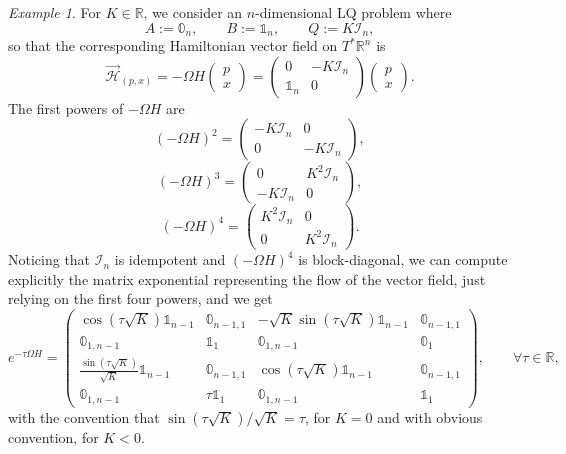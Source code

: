 \documentclass[reqno]{amsart}
\theoremstyle{plain}
\theoremstyle{definition}
\theoremstyle{remark}
\newtheorem{exmp}[thm]{Example}
\begin{document}
\begin{exmp}
			For $K\in\mathbb{R}$, we consider an $n$-dimensional LQ problem where 
			\begin{equation}
				A:=\mathbb{0}_n,\qquad B:=\mathbb{1}_n,\qquad Q:=K\mathcal{I}_n,
			\end{equation}
			so that the corresponding Hamiltonian vector field on $T^*\mathbb{R}^n$ is 
			\begin{equation}
				\overrightarrow{\mathcal{H}}_{(p,x)}=-\Omega H\begin{pmatrix}
					p\\
					x
				\end{pmatrix}=\begin{pmatrix}
					0 & -K\mathcal{I}_n\\
					\mathbb{1}_n & 0
				\end{pmatrix}\begin{pmatrix}
					p\\
					x
				\end{pmatrix}.
			\end{equation}
			The first powers of $-\Omega H$ are 
			\begin{equation}
				(-\Omega H)^2=\begin{pmatrix}
					-K\mathcal{I}_n & 0\\
					0 & -K\mathcal{I}_n
				\end{pmatrix},
			\end{equation}
			\begin{equation}
				(-\Omega H)^3=\begin{pmatrix}
					0 & K^2\mathcal{I}_n\\
					-K\mathcal{I}_n& 0
				\end{pmatrix},
			\end{equation}
			\begin{equation}
				(-\Omega H)^4=\begin{pmatrix}
					K^2\mathcal{I}_n & 0\\
					0 & K^2\mathcal{I}_n
				\end{pmatrix}.
			\end{equation}
			Noticing that $\mathcal{I}_n$ is idempotent and $(-\Omega H)^4$ is block-diagonal, we can compute explicitly the matrix exponential representing the flow of the vector field, just relying on the first four powers, and we get
			\begin{equation}
				e^{-\tau\Omega H}=\begin{pmatrix}
					\cos(\tau\sqrt{K})\mathbb{1}_{n-1}& \mathbb{0}_{n-1,1} & -\sqrt{K}\sin(\tau\sqrt{K})\mathbb{1}_{n-1} &\mathbb{0}_{n-1,1}\\
					\mathbb{0}_{1,n-1} & \mathbb{1}_1 & \mathbb{0}_{1,n-1} & \mathbb{0}_1\\
					\frac{\sin(\tau\sqrt{K})}{\sqrt{K}}\mathbb{1}_{n-1} & \mathbb{0}_{n-1,1} & \cos(\tau\sqrt{K})\mathbb{1}_{n-1}&\mathbb{0}_{n-1,1}\\
					\mathbb{0}_{1,n-1} & \tau\mathbb{1}_1 & \mathbb{0}_{1,n-1} & \mathbb{1}_1
				\end{pmatrix},\qquad\forall \tau\in\mathbb{R},
			\end{equation}
			with the convention that $\sin(\tau\sqrt{K})/\sqrt{K}=\tau$, for $K=0$ and with obvious convention, for $K<0$.
			

\end{exmp}
\end{document}
